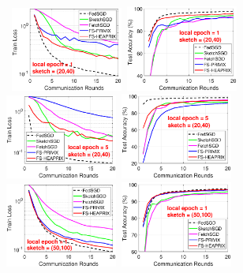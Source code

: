 \documentclass[11pt]{article}
\begin{document}
\begin{figure}[t]
	\begin{center}
		\mbox{\hspace{-0.25in}			  
		 \includegraphics[width=1.45in]{MNIST_figures/local1_sketch20_iid1_train_loss.eps} \hspace{-0.12in}
		 \includegraphics[width=1.45in]{MNIST_figures/local1_sketch20_iid1_test_acc.eps} 
		\includegraphics[width=1.45in]{MNIST_figures/local5_sketch20_iid1_train_loss.eps}\hspace{-0.12in}
		\includegraphics[width=1.45in]{MNIST_figures/local5_sketch20_iid1_test_acc.eps}
		}
		\mbox{\hspace{-0.25in}	
		\includegraphics[width=1.45in]{MNIST_figures/local1_sketch50_iid1_train_loss.eps} \hspace{-0.12in}
		\includegraphics[width=1.45in]{MNIST_figures/local1_sketch50_iid1_test_acc.eps} 
}
\end{center}
\end{figure}
\end{document}
